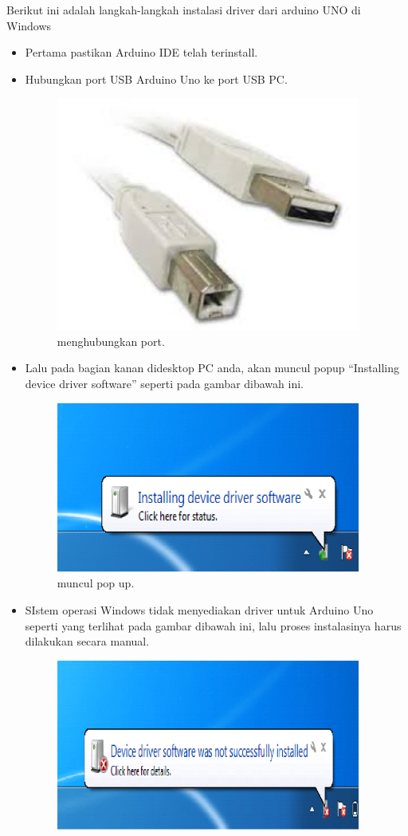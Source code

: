 Berikut ini adalah langkah-langkah instalasi driver dari arduino UNO di Windows
	\begin{itemize}
		\item Pertama pastikan Arduino IDE telah terinstall.
		\item Hubungkan port USB Arduino Uno ke port USB PC.
			\begin{figure}[ht]
				\includegraphics[width=10cm]{figures/5/1174083/Teori/kabel.jpg}
				\centering
				\caption{menghubungkan port.}
			\end{figure}
		\item Lalu pada bagian kanan didesktop PC anda, akan muncul popup “Installing device driver software” seperti pada gambar dibawah ini.
			\begin{figure}[ht]
				\includegraphics[width=10cm]{figures/5/1174083/Teori/2.png}
				\centering
				\caption{muncul pop up.}
			\end{figure}
		\item SIstem operasi Windows tidak menyediakan driver untuk Arduino Uno seperti yang terlihat pada gambar dibawah ini, lalu proses instalasinya harus dilakukan secara manual.
			\begin{figure}[ht]
				\includegraphics[width=10cm]{figures/5/1174083/Teori/3.png}

\end{figure}
\end{itemize}

